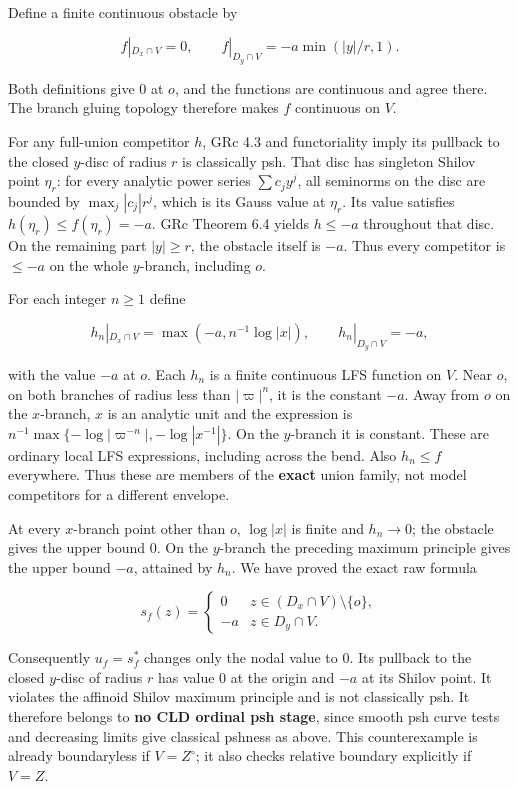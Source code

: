 \documentclass[
  11pt,
]{article}
\begin{document}
Define a finite continuous obstacle by

\[
f|_{D_x\cap V}=0,\qquad
f|_{D_y\cap V}=-a\min(|y|/r,1).
\]

Both definitions give 0 at \(o\), and the functions are continuous and
agree there. The branch gluing topology therefore makes \(f\) continuous
on \(V\).

For any full-union competitor \(h\), GRc 4.3 and functoriality imply its
pullback to the closed \(y\)-disc of radius \(r\) is classically psh.
That disc has singleton Shilov point \(\eta_r\): for every analytic
power series \(\sum c_jy^j\), all seminorms on the disc are bounded by
\(\max_j|c_j|r^j\), which is its Gauss value at \(\eta_r\). Its value
satisfies \(h(\eta_r)\leq f(\eta_r)=-a\). GRc Theorem 6.4 yields
\(h\leq-a\) throughout that disc. On the remaining part \(|y|\geq r\),
the obstacle itself is \(-a\). Thus every competitor is \(\leq-a\) on
the whole \(y\)-branch, including \(o\).

For each integer \(n\geq1\) define

\[
h_n|_{D_x\cap V}=\max(-a,n^{-1}\log|x|),\qquad
h_n|_{D_y\cap V}=-a,
\]

with the value \(-a\) at \(o\). Each \(h_n\) is a finite continuous LFS
function on \(V\). Near \(o\), on both branches of radius less than
\(|\varpi|^n\), it is the constant \(-a\). Away from \(o\) on the
\(x\)-branch, \(x\) is an analytic unit and the expression is
\(n^{-1}\max\{-\log|\varpi^{-n}|,-\log|x^{-1}|\}\). On the \(y\)-branch
it is constant. These are ordinary local LFS expressions, including
across the bend. Also \(h_n\leq f\) everywhere. Thus these are members
of the \textbf{exact} union family, not model competitors for a
different envelope.

At every \(x\)-branch point other than \(o\), \(\log|x|\) is finite and
\(h_n\to0\); the obstacle gives the upper bound 0. On the \(y\)-branch
the preceding maximum principle gives the upper bound \(-a\), attained
by \(h_n\). We have proved the exact raw formula

\[
s_f(z)=\begin{cases}0&z\in(D_x\cap V)\setminus\{o\},\\-a&z\in D_y\cap V.\end{cases}
\]

Consequently \(u_f=s_f^*\) changes only the nodal value to 0. Its
pullback to the closed \(y\)-disc of radius \(r\) has value 0 at the
origin and \(-a\) at its Shilov point. It violates the affinoid Shilov
maximum principle and is not classically psh. It therefore belongs to
\textbf{no CLD ordinal psh stage}, since smooth psh curve tests and
decreasing limits give classical pshness as above. This counterexample
is already boundaryless if \(V=Z^\circ\); it also checks relative
boundary explicitly if \(V=Z\).
\end{document}
